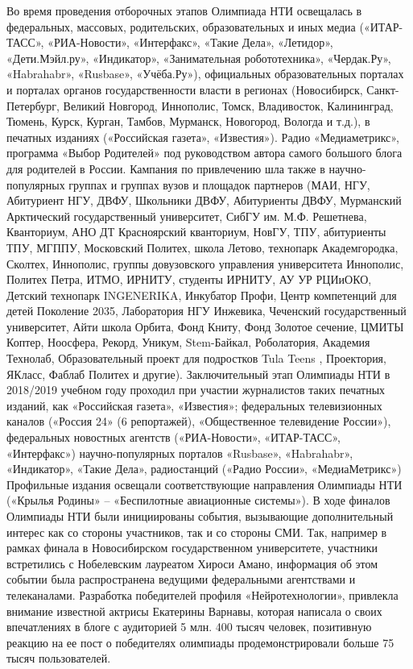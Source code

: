 Во время проведения отборочных этапов Олимпиада НТИ освещалась в федеральных, массовых, родительских, образовательных и иных медиа («ИТАР-ТАСС», «РИА-Новости», «Интерфакс», «Такие Дела», «Летидор», «Дети.Мэйл.ру», «Индикатор», «Занимательная робототехника», «Чердак.Ру», «Habrahabr», «Rusbase», \linebreak «Учёба.Ру»), официальных образовательных порталах и порталах органов государственности власти в регионах  (Новосибирск, Санкт-Петербург, Великий Новгород, Иннополис, Томск, Владивосток, Калининград, Тюмень, Курск, Курган, Тамбов, Мурманск, Новогород, Вологда и т.д.), в печатных изданиях («Российская газета», «Известия»). Радио «Медиаметрикс», программа «Выбор Родителей» под руководством автора самого большого блога для родителей в России.  Кампания по привлечению шла также в научно-популярных группах и группах вузов и площадок партнеров (МАИ, НГУ, Абитуриент НГУ,  ДВФУ, Школьники ДВФУ, Абитуриенты ДВФУ, Мурманский Арктический государственный университет, СибГУ им. М.Ф. Решетнева, Кванториум, АНО ДТ Красноярский кванториум,  НовГУ, ТПУ, абитуриенты ТПУ, МГППУ, Московский Политех, школа Летово, технопарк Академгородка, Сколтех, Иннополис, группы довузовского управления университета Иннополис, Политех Петра, ИТМО, ИРНИТУ, студенты ИРНИТУ, АУ УР РЦИиОКО, Детский технопарк INGENERIKA, Инкубатор Профи, Центр компетенций для детей Поколение 2035, Лаборатория НГУ Инжевика, Чеченский государственный университет, Айти школа Орбита, Фонд Книту, Фонд Золотое сечение, ЦМИТЫ Коптер, Ноосфера, Рекорд, Уникум, Stem-Байкал, Роболатория, Академия Технолаб, Образовательный проект для подростков Tula Teens ,  Проектория, ЯКласс, Фаблаб Политех и другие).  Заключительный этап Олимпиады НТИ в 2018/2019 учебном году проходил при участии журналистов таких печатных изданий, как «Российская газета», «Известия»; федеральных телевизионных каналов («Россия 24» (6 репортажей), «Общественное телевидение России»), федеральных новостных агентств («РИА-Новости», «ИТАР-ТАСС», «Интерфакс») научно-популярных порталов  «Rusbase», «Habrahabr», «Индикатор», «Такие Дела», радиостанций («Радио России», «МедиаМетрикс») Профильные издания освещали соответствующие направления Олимпиады НТИ («Крылья Родины» – «Беспилотные авиационные системы»). В ходе финалов Олимпиады НТИ были инициированы события, вызывающие дополнительный интерес как со стороны участников, так и со стороны СМИ. Так, например в рамках финала в Новосибирском государственном университете, участники встретились с Нобелевским лауреатом Хироси Амано, информация об этом событии была распространена ведущими федеральными агентствами и телеканалами. Разработка победителей профиля «Нейротехнологии», привлекла внимание известной актрисы Екатерины Варнавы, которая написала о своих впечатлениях в блоге с аудиторией 5 млн. 400 тысяч человек, позитивную реакцию на ее пост о победителях олимпиады продемонстрировали больше 75 тысяч пользователей. 

